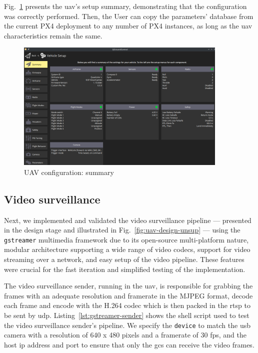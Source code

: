 Fig.~\ref{fig:uav-cfg-summary} presents the \gls{uav}'s setup summary,
demonstrating that the configuration was correctly performed. Then, the User can
copy the parameters' database from the current PX4 deployment to any number of
PX4 instances, as long as the \gls{uav} characteristics remain the same.

\begin{figure}[!hbt]
  \centering
  \includegraphics[width=0.9\textwidth]{./img/png/qgc-summary} 
  \caption{UAV configuration: summary}
  \label{fig:uav-cfg-summary}
\end{figure}

\subsection{Video surveillance}
\label{sec:video-surveillance}

Next, we implemented and validated the video surveillance pipeline --- presented
in the design stage and illustrated in Fig.~\ref{fig:uav-design-unsup} --- using the
\texttt{gstreamer} multimedia framework due to its open-source multi-platform
nature, modular architecture supporting a wide range of video codecs,
support for video streaming over a network, and easy setup of the video
pipeline. These features were crucial for the fast iteration and simplified testing
of the implementation.

The video surveillance sender, running in the \gls{uav}, is responsible for
grabbing the frames with an adequate resolution and framerate in the MJPEG
format, decode each frame and encode with the H.264 codec which is then packed
in the \gls{rtsp} to be sent by \gls{udp}. Listing~\ref{lst:gstreamer-sender}
shows the shell script used to test the video surveillance sender's pipeline. We
specify the \texttt{device} to match the \gls{usb} camera with a resolution of
640 x 480 pixels and a framerate of 30 \gls{fps}, and the host \gls{ip} address
and port to ensure that only the \gls{gcs} can receive the video frames.

